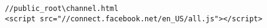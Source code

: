 \small
\lstset{basicstyle=\ttfamily,breaklines=true}
\begin{lstlisting}
//public_root\channel.html
<script src="//connect.facebook.net/en_US/all.js"></script>
\end{lstlisting}
